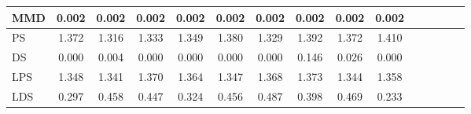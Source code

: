 \documentclass[make,article,submit,moreauthors]{Definitions/mdpi}
\begin{document}
\begin{table}[htbp]
\begin{tabular*}{\textwidth}{@{\extracolsep{\fill}}l|cccccccccccccc}
MMD                                 & 0.002   & 0.002   & 0.002   & 0.002   & 0.002   & 0.002   & 0.002    & 0.002   & 0.002           \\ \hline
PS                                  & 1.372   & 1.316   & 1.333   & 1.349   & 1.380   & 1.329   & 1.392    & 1.372   & 1.410           \\ \hline
DS                                  & 0.000   & 0.004   & 0.000   & 0.000   & 0.000   & 0.000   & 0.146    & 0.026   & 0.000           \\ \hline
LPS                                 & 1.348   & 1.341   & 1.370   & 1.364   & 1.347   & 1.368   & 1.373    & 1.344   & 1.358           \\ \hline
LDS                                 & 0.297   & 0.458   & 0.447   & 0.324   & 0.456   & 0.487   & 0.398    & 0.469   & 0.233          \\

\bottomrule
\end{tabular*}
\end{table}
\end{document}
